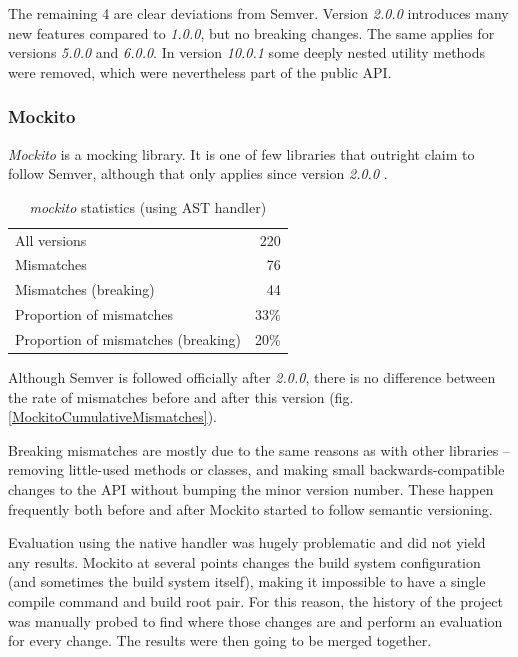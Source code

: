 \documentclass{l4proj}
\begin{document}
The remaining 4 are clear deviations from Semver. Version
\textit{2.0.0} introduces many new features compared to
\textit{1.0.0}, but no breaking changes. The same applies for versions
\textit{5.0.0} and \textit{6.0.0}. In version \textit{10.0.1} some
deeply nested utility methods were removed, which were nevertheless
part of the public API.

\subsubsection{Mockito}

\textit{Mockito} \cite{Mockito} is a mocking library. It is one of few
libraries that outright claim to follow Semver, although that only
applies since version \textit{2.0.0} \cite{MockitoSemver}.

\begin{table}
\centering
\caption{\textit{mockito} statistics (using AST handler)}
\label{MockitoStatistics}
\begin{tabular}{|lr|}
All versions & 220 \\
Mismatches & 76 \\
Mismatches (breaking) & 44 \\
Proportion of mismatches & 33\% \\
Proportion of mismatches (breaking) & 20\% \\
\end{tabular}
\end{table}

Although Semver is followed officially after \textit{2.0.0}, there is
no difference between the rate of mismatches before and after this
version (fig. \ref{MockitoCumulativeMismatches}).

Breaking mismatches are mostly due to the same reasons as with other
libraries -- removing little-used methods or classes, and making small
backwards-compatible changes to the API without bumping the minor
version number. These happen frequently both before and after Mockito
started to follow semantic versioning.

Evaluation using the native handler was hugely problematic and did not
yield any results. Mockito at several points changes the build system
configuration (and sometimes the build system itself), making it
impossible to have a single compile command and build root pair. For
this reason, the history of the project was manually probed to find
where those changes are and perform an evaluation for every change.
The results were then going to be merged together.
\end{document}
